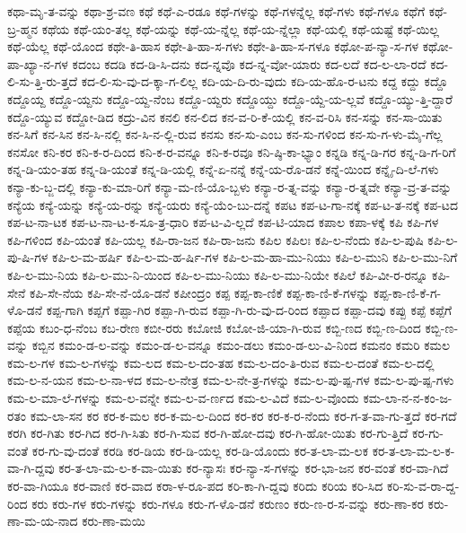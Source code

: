 {ಕಥಾ-ಮೃ-ತ-ವನ್ನು
ಕಥಾ-ಶ್ರ-ವಣ
ಕಥೆ
ಕಥೆ-ಎ-ರಡೂ
ಕಥೆ-ಗಳನ್ನು
ಕಥೆ-ಗಳನ್ನೆಲ್ಲ
ಕಥೆ-ಗಳು
ಕಥೆ-ಗಳೂ
ಕಥೆಗೆ
ಕಥೆ-ಬ್ರ-ಹ್ಮನ
ಕಥೆಯ
ಕಥೆ-ಯಂ-ತಲ್ಲ
ಕಥೆ-ಯನ್ನು
ಕಥೆ-ಯ-ನ್ನೆಲ್ಲ
ಕಥೆ-ಯ-ನ್ನೆಲ್ಲಾ
ಕಥೆ-ಯಲ್ಲಿ
ಕಥೆ-ಯಷ್ಟೆ
ಕಥೆ-ಯಿಲ್ಲ
ಕಥೆ-ಯೆಲ್ಲ
ಕಥೆ-ಯೊಂದ
ಕಥೇ-ತಿ-ಹಾಸ
ಕಥೇ-ತಿ-ಹಾ-ಸ-ಗಳು
ಕಥೇ-ತಿ-ಹಾ-ಸ-ಗಳೂ
ಕಥೋ-ಪ-ನ್ಯಾ-ಸ-ಗಳ
ಕಥೋ-ಪಾ-ಖ್ಯಾ-ನ-ಗಳ
ಕದಂಬ
ಕದಡಿ
ಕದ-ಡಿ-ಸಿ-ದನು
ಕದ-ನ್ನವೊ
ಕದ-ನ್ನ-ವೋ-ಯಾರು
ಕದ-ಲದೆ
ಕದ-ಲ-ಲಾ-ರದೆ
ಕದ-ಲಿ-ಸು-ತ್ತಿ-ರು-ತ್ತದೆ
ಕದ-ಲಿ-ಸು-ವು-ದ-ಕ್ಕಾ-ಗ-ಲಿಲ್ಲ
ಕದಿ-ಯ-ದಿ-ರು-ವುದು
ಕದಿ-ಯ-ಹೊ-ರ-ಟನು
ಕದ್ದ
ಕದ್ದು
ಕದ್ದೊ
ಕದ್ದೊಯ್ದ
ಕದ್ದೊ-ಯ್ದನು
ಕದ್ದೊ-ಯ್ದ-ನೆಂಬ
ಕದ್ದೊ-ಯ್ದರು
ಕದ್ದೊಯ್ದು
ಕದ್ದೊ-ಯ್ದೆ-ಯ-ಲ್ಲವೆ
ಕದ್ದೊ-ಯ್ಯು-ತ್ತಿ-ದ್ದಾರೆ
ಕದ್ದೊ-ಯ್ಯುವ
ಕದ್ದೋ-ಡಿದ
ಕದ್ರು-ವಿನ
ಕನಲಿ
ಕನ-ಲಿದ
ಕನ-ವ-ರಿ-ಕೆ-ಯಲ್ಲಿ
ಕನ-ವ-ರಿಸಿ
ಕನ-ಸನ್ನು
ಕನ-ಸಾ-ಯಿತು
ಕನ-ಸಿಗೆ
ಕನ-ಸಿನ
ಕನ-ಸಿ-ನಲ್ಲಿ
ಕನ-ಸಿ-ನ-ಲ್ಲಿ-ರುವ
ಕನಸು
ಕನ-ಸು-ಎಂಬ
ಕನ-ಸು-ಗಳಿಂದ
ಕನ-ಸು-ಗ-ಳು-ಮೈ-ಗೆಲ್ಲ
ಕನಸೋ
ಕನಿ-ಕರ
ಕನಿ-ಕ-ರ-ದಿಂದ
ಕನಿ-ಕ-ರ-ವನ್ನೂ
ಕನಿ-ಕ-ರವೂ
ಕನಿ-ಷ್ಠಿ-ಕಾ-ಭ್ಯಾಂ
ಕನ್ನಡಿ
ಕನ್ನ-ಡಿ-ಗರ
ಕನ್ನ-ಡಿ-ಗ-ರಿಗೆ
ಕನ್ನ-ಡಿ-ಯಂ-ತಹ
ಕನ್ನ-ಡಿ-ಯಂತೆ
ಕನ್ನ-ಡಿ-ಯಲ್ಲಿ
ಕನ್ನೆ-ಏ-ನನ್ನೆ
ಕನ್ನೆ-ಯ-ರೊ-ಡನೆ
ಕನ್ನೆ-ಯಿಂದ
ಕನ್ನೈ-ದಿ-ಲೆ-ಗಳು
ಕನ್ಯಾ-ಕು-ಬ್ಜ-ದಲ್ಲಿ
ಕನ್ಯಾ-ಕು-ಮಾ-ರಿಗೆ
ಕನ್ಯಾ-ಮ-ಣಿ-ಯೊ-ಬ್ಬಳು
ಕನ್ಯಾ-ರ-ತ್ನ-ವನ್ನು
ಕನ್ಯಾ-ರ-ತ್ನವೇ
ಕನ್ಯಾ-ವ್ರ-ತ-ವನ್ನು
ಕನ್ಯೆಯ
ಕನ್ಯೆ-ಯನ್ನು
ಕನ್ಯೆ-ಯ-ರನ್ನು
ಕನ್ಯೆ-ಯರು
ಕನ್ಯೆ-ಯೆಂ-ಬು-ದನ್ನೆ
ಕಪಟ
ಕಪ-ಟ-ಗಾ-ನಕ್ಕೆ
ಕಪ-ಟ-ತ-ನಕ್ಕೆ
ಕಪ-ಟದ
ಕಪ-ಟ-ನಾ-ಟಕ
ಕಪ-ಟ-ನಾ-ಟ-ಕ-ಸೂ-ತ್ರ-ಧಾರಿ
ಕಪ-ಟ-ವಿ-ಲ್ಲದೆ
ಕಪ-ಟಿ-ಯಾದ
ಕಪಾಲ
ಕಪಾ-ಳಕ್ಕೆ
ಕಪಿ
ಕಪಿ-ಗಳ
ಕಪಿ-ಗಳಿಂದ
ಕಪಿ-ಯಂತೆ
ಕಪಿ-ಯಲ್ಲ
ಕಪಿ-ರಾ-ಜನ
ಕಪಿ-ರಾ-ಜನು
ಕಪಿಲ
ಕಪಿಲಃ
ಕಪಿ-ಲ-ನೆಂದು
ಕಪಿ-ಲ-ಪುಷಿ
ಕಪಿ-ಲ-ಪು-ಷಿ-ಗಳ
ಕಪಿ-ಲ-ಮ-ಹರ್ಷಿ
ಕಪಿ-ಲ-ಮ-ಹ-ರ್ಷಿ-ಗಳ
ಕಪಿ-ಲ-ಮ-ಹಾ-ಮು-ನಿಯು
ಕಪಿ-ಲ-ಮುನಿ
ಕಪಿ-ಲ-ಮು-ನಿಗೆ
ಕಪಿ-ಲ-ಮು-ನಿಯ
ಕಪಿ-ಲ-ಮು-ನಿ-ಯಿಂದ
ಕಪಿ-ಲ-ಮು-ನಿಯು
ಕಪಿ-ಲ-ಮು-ನಿಯೇ
ಕಪಿಲೆ
ಕಪಿ-ವೀ-ರ-ರನ್ನೂ
ಕಪಿ-ಸೇನೆ
ಕಪಿ-ಸೇ-ನೆಯ
ಕಪಿ-ಸೇ-ನೆ-ಯೊ-ಡನೆ
ಕಪೀಂದ್ರಂ
ಕಪ್ಪ
ಕಪ್ಪ-ಕಾ-ಣಿಕೆ
ಕಪ್ಪ-ಕಾ-ಣಿ-ಕೆ-ಗಳನ್ನು
ಕಪ್ಪ-ಕಾ-ಣಿ-ಕೆ-ಗ-ಳೊ-ಡನೆ
ಕಪ್ಪ-ಗಾಗಿ
ಕಪ್ಪಗೆ
ಕಪ್ಪಾ-ಗಿರ
ಕಪ್ಪಾ-ಗಿ-ರುವ
ಕಪ್ಪಾ-ಗಿ-ರು-ವು-ದ-ರಿಂದ
ಕಪ್ಪಾದ
ಕಪ್ಪಾ-ದವು
ಕಪ್ಪು
ಕಪ್ಪೆ
ಕಪ್ಪೆಗೆ
ಕಪ್ಪೆಯ
ಕಬಂ-ಧ-ನೆಂಬ
ಕಬ-ರೇಣ
ಕಬೀ-ರರು
ಕಬೋಜಿ
ಕಬೋ-ಜಿ-ಯಾ-ಗಿ-ರುವ
ಕಬ್ಬಿ-ಣದ
ಕಬ್ಬಿ-ಣ-ದಿಂದ
ಕಬ್ಬಿ-ಣ-ವನ್ನು
ಕಬ್ಬಿನ
ಕಮಂ-ಡ-ಲ-ವನ್ನು
ಕಮಂ-ಡ-ಲ-ವನ್ನೂ
ಕಮಂ-ಡಲು
ಕಮಂ-ಡ-ಲು-ವಿ-ನಿಂದ
ಕಮನಂ
ಕಮರಿ
ಕಮಲ
ಕಮ-ಲ-ಗಳ
ಕಮ-ಲ-ಗಳನ್ನು
ಕಮ-ಲದ
ಕಮ-ಲ-ದಂ-ತಹ
ಕಮ-ಲ-ದಂ-ತಿ-ರುವ
ಕಮ-ಲ-ದಂತೆ
ಕಮ-ಲ-ದಲ್ಲಿ
ಕಮ-ಲ-ನ-ಯನ
ಕಮ-ಲ-ನಾ-ಳದ
ಕಮ-ಲ-ನೇತ್ರ
ಕಮ-ಲ-ನೇ-ತ್ರ-ಗಳನ್ನು
ಕಮ-ಲ-ಪು-ಷ್ಪ-ಗಳ
ಕಮ-ಲ-ಪು-ಷ್ಪ-ಗಳು
ಕಮ-ಲ-ಮಾ-ಲೆ-ಗಳನ್ನು
ಕಮ-ಲ-ವನ್ನೇ
ಕಮ-ಲ-ವ-ರ್ಣದ
ಕಮ-ಲ-ವಿದೆ
ಕಮ-ಲ-ವೊಂದು
ಕಮ-ಲಾ-ನ-ನ-ಕಂ-ಜ-ರತಂ
ಕಮ-ಲಾ-ಸನ
ಕರ
ಕರ-ಕ-ಮಲ
ಕರ-ಕ-ಮ-ಲ-ದಿಂದ
ಕರ-ಕರ
ಕರ-ಕ-ರ-ನೆಂದು
ಕರ-ಗ-ತ-ವಾ-ಗು-ತ್ತದೆ
ಕರ-ಗದೆ
ಕರಗಿ
ಕರ-ಗಿತು
ಕರ-ಗಿದ
ಕರ-ಗಿ-ಸಿತು
ಕರ-ಗಿ-ಸುವ
ಕರ-ಗಿ-ಹೋ-ದವು
ಕರ-ಗಿ-ಹೋ-ಯಿತು
ಕರ-ಗು-ತ್ತಿದೆ
ಕರ-ಗು-ವಂತೆ
ಕರ-ಗು-ವು-ದಂತೆ
ಕರಡಿ
ಕರ-ಡಿಯ
ಕರ-ಡಿ-ಯಲ್ಲ
ಕರ-ಡಿ-ಯೊಂದು
ಕರ-ತ-ಲಾ-ಮ-ಲಕ
ಕರ-ತ-ಲಾ-ಮ-ಲ-ಕ-ವಾ-ಗಿ-ದ್ದವು
ಕರ-ತ-ಲಾ-ಮ-ಲ-ಕ-ವಾ-ಯಿತು
ಕರ-ನ್ಯಾಸಃ
ಕರ-ನ್ಯಾ-ಸ-ಗಳನ್ನು
ಕರ-ಭಾ-ಜನ
ಕರ-ವಂತೆ
ಕರ-ವಾ-ಗಿದೆ
ಕರ-ವಾ-ಗಿಯೂ
ಕರ-ವಾಣಿ
ಕರ-ವಾದ
ಕರಾ-ಳ-ರೂ-ಪದ
ಕರಿ-ಕಾ-ಗಿ-ದ್ದವು
ಕರಿದು
ಕರಿಯ
ಕರಿ-ಸಿದ
ಕರಿ-ಸು-ವ-ರಾ-ದ್ದ-ರಿಂದ
ಕರು
ಕರು-ಗಳ
ಕರು-ಗಳನ್ನು
ಕರು-ಗಳೂ
ಕರು-ಗ-ಳೊ-ಡನೆ
ಕರುಣಂ
ಕರು-ಣ-ರ-ಸ-ವನ್ನು
ಕರು-ಣಾ-ಕರ
ಕರು-ಣಾ-ಮ-ಯ-ನಾದ
ಕರು-ಣಾ-ಮಯಿ
}
